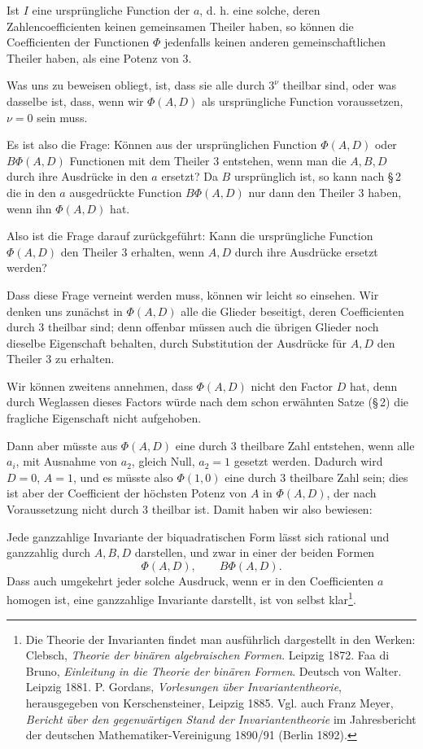 \documentclass[11pt]{article}
\begin{document}
Ist $I$ eine ursprüngliche Function der $a$, d. h. eine solche, deren Zahlencoefficienten keinen gemeinsamen Theiler haben, so können die Coefficienten der Functionen $\Phi$ jedenfalls keinen anderen gemeinschaftlichen Theiler haben, als eine Potenz von $3$.

Was uns zu beweisen obliegt, ist, dass sie alle durch $3^\nu$ theilbar sind, oder was dasselbe ist, dass, wenn wir $\Phi(A,D)$ als ursprüngliche Function voraussetzen, $\nu=0$ sein muss.

Es ist also die Frage: Können aus der ursprünglichen Function $\Phi(A,D)$ oder $B\Phi(A,D)$ Functionen mit dem Theiler $3$ entstehen, wenn man die $A,B,D$ durch ihre Ausdrücke in den $a$ ersetzt? Da $B$ ursprünglich ist, so kann nach \S\,2 die in den $a$ ausgedrückte Function $B\Phi(A,D)$ nur dann den Theiler $3$ haben, wenn ihn $\Phi(A,D)$ hat.

Also ist die Frage darauf zurückgeführt: Kann die ursprüngliche Function $\Phi(A,D)$ den Theiler $3$ erhalten, wenn $A,D$ durch ihre Ausdrücke ersetzt werden?

Dass diese Frage verneint werden muss, können wir leicht so einsehen. Wir denken uns zunächst in $\Phi(A,D)$ alle die Glieder beseitigt, deren Coefficienten durch $3$ theilbar sind; denn offenbar müssen auch die übrigen Glieder noch dieselbe Eigenschaft behalten, durch Substitution der Ausdrücke für $A,D$ den Theiler $3$ zu erhalten.

Wir können zweitens annehmen, dass $\Phi(A,D)$ nicht den Factor $D$ hat, denn durch Weglassen dieses Factors würde nach dem schon erwähnten Satze (\S\,2) die fragliche Eigenschaft nicht aufgehoben.

Dann aber müsste aus $\Phi(A,D)$ eine durch $3$ theilbare Zahl entstehen, wenn alle $a_i$, mit Ausnahme von $a_2$, gleich Null, $a_2=1$ gesetzt werden. Dadurch wird $D=0$, $A=1$, und es müsste also $\Phi(1,0)$ eine durch $3$ theilbare Zahl sein; dies ist aber der Coefficient der höchsten Potenz von $A$ in $\Phi(A,D)$, der nach Voraussetzung nicht durch $3$ theilbar ist. Damit haben wir also bewiesen:

Jede ganzzahlige Invariante der biquadratischen Form lässt sich rational und ganzzahlig durch $A,B,D$ darstellen, und zwar in einer der beiden Formen
\[
 \Phi(A,D),
 \qquad
 B\Phi(A,D).
\]
Dass auch umgekehrt jeder solche Ausdruck, wenn er in den Coefficienten $a$ homogen ist, eine ganzzahlige Invariante darstellt, ist von selbst klar\footnote{Die Theorie der Invarianten findet man ausführlich dargestellt in den Werken: Clebsch, \emph{Theorie der binären algebraischen Formen}. Leipzig 1872. Faa di Bruno, \emph{Einleitung in die Theorie der binären Formen}. Deutsch von Walter. Leipzig 1881. P. Gordans, \emph{Vorlesungen über Invariantentheorie}, herausgegeben von Kerschensteiner, Leipzig 1885. Vgl. auch Franz Meyer, \emph{Bericht über den gegenwärtigen Stand der Invariantentheorie} im Jahresbericht der deutschen Mathematiker-Vereinigung 1890/91 (Berlin 1892).}.
\end{document}

